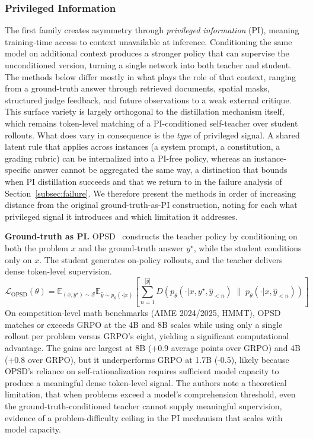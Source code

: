 \documentclass{article} %
\newcommand{\E}{\mathbb{E}}
\newcommand{\ptheta}{p_\theta}
\newcommand{\loss}{\mathcal{L}}
\begin{document}
\subsubsection{Privileged Information}
\label{subsec:self_pi}

The first family creates asymmetry through \emph{privileged information} (PI), meaning training-time access to context unavailable at inference. Conditioning the same model on additional context produces a stronger policy that can supervise the unconditioned version, turning a single network into both teacher and student. The methods below differ mostly in what plays the role of that context, ranging from a ground-truth answer through retrieved documents, spatial masks, structured judge feedback, and future observations to a weak external critique. This surface variety is largely orthogonal to the distillation mechanism itself, which remains token-level matching of a PI-conditioned self-teacher over student rollouts. What does vary in consequence is the \emph{type} of privileged signal. A shared latent rule that applies across instances (a system prompt, a constitution, a grading rubric) can be internalized into a PI-free policy, whereas an instance-specific answer cannot be aggregated the same way, a distinction that bounds when PI distillation succeeds and that we return to in the failure analysis of Section~\ref{subsec:failure}. We therefore present the methods in order of increasing distance from the original ground-truth-as-PI construction, noting for each what privileged signal it introduces and which limitation it addresses.

\textbf{Ground-truth as PI.} OPSD~\citep{2601.18734} constructs the teacher policy by conditioning on both the problem $x$ and the ground-truth answer $y^\star$, while the student conditions only on $x$. The student generates on-policy rollouts, and the teacher delivers dense token-level supervision.
\begin{equation*}
    \loss_{\text{OPSD}}(\theta) = \E_{(x, y^\star) \sim \mathcal{S}} \E_{\hat{y} \sim \ptheta(\cdot|x)} \left[ \sum_{n=1}^{|\hat{y}|} D\!\left( p_\theta(\cdot|x, y^\star, \hat{y}_{<n}) \;\|\; \ptheta(\cdot|x, \hat{y}_{<n}) \right) \right]
\end{equation*}
On competition-level math benchmarks (AIME 2024/2025, HMMT), OPSD matches or exceeds GRPO at the 4B and 8B scales while using only a single rollout per problem versus GRPO's eight, yielding a significant computational advantage. The gains are largest at 8B (+0.9 average points over GRPO) and 4B (+0.8 over GRPO), but it underperforms GRPO at 1.7B (-0.5), likely because OPSD's reliance on self-rationalization requires sufficient model capacity to produce a meaningful dense token-level signal. The authors note a theoretical limitation, that when problems exceed a model's comprehension threshold, even the ground-truth-conditioned teacher cannot supply meaningful supervision, evidence of a problem-difficulty ceiling in the PI mechanism that scales with model capacity.
\end{document}

